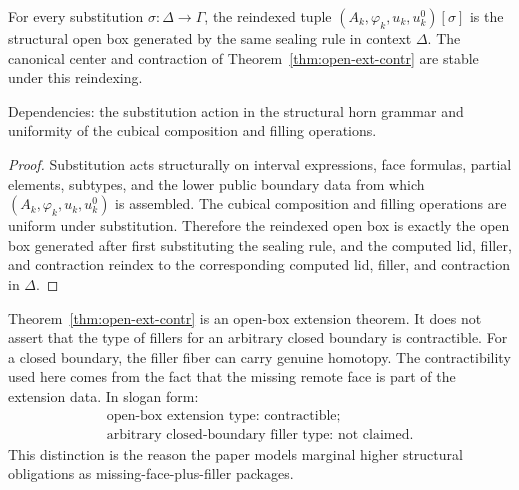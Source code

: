 \documentclass{lmcs}
\begin{document}
\begin{lem}
\label{lem:open-box-substitution}
For every substitution \(\sigma:\Delta\to\Gamma\), the reindexed tuple
\((A_k,\varphi_k,u_k,u^0_k)[\sigma]\) is the structural open box generated by the same
sealing rule in context \(\Delta\).  The canonical center and contraction of
Theorem~\ref{thm:open-ext-contr} are stable under this reindexing.

Dependencies: the substitution action in the structural horn grammar and uniformity of the
cubical composition and filling operations.
\end{lem}

\begin{proof}
Substitution acts structurally on interval expressions, face formulas, partial elements,
subtypes, and the lower public boundary data from which \((A_k,\varphi_k,u_k,u^0_k)\) is
assembled.  The cubical composition and filling operations are uniform under substitution.
Therefore the reindexed open box is exactly the open box generated after first substituting
the sealing rule, and the computed lid, filler, and contraction reindex to the corresponding
computed lid, filler, and contraction in \(\Delta\).
\end{proof}

\begin{rem}
\label{rem:open-not-closed}
Theorem~\ref{thm:open-ext-contr} is an open-box extension theorem.  It does not assert that
the type of fillers for an arbitrary closed boundary is contractible.  For a closed boundary,
the filler fiber can carry genuine homotopy.  The contractibility used here comes from the
fact that the missing remote face is part of the extension data.  In slogan form:
\[
  \begin{gathered}
  \text{open-box extension type: contractible;}\\
  \text{arbitrary closed-boundary filler type: not claimed.}
  \end{gathered}
\]
This distinction is the reason the paper models marginal higher structural obligations as
missing-face-plus-filler packages.
\end{rem}
\end{document}
